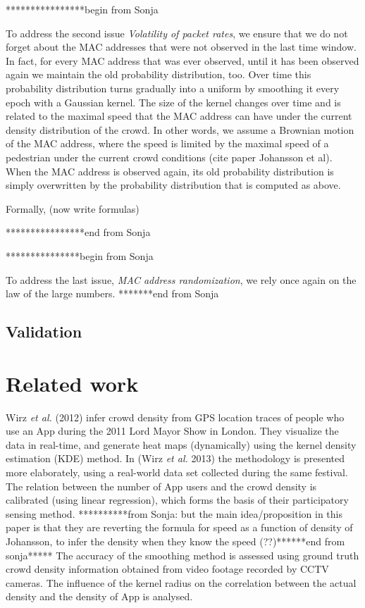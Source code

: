 \documentclass[10pt,a4paper]{article}
\begin{document}
****************begin from Sonja

To address the second issue {\it Volatility of packet rates}, we ensure that we do not forget about the MAC addresses that were not observed in the last time window. In fact, for every MAC address that was ever observed, until it has been observed again we maintain the old probability distribution, too. Over time this probability distribution turns gradually into a uniform by smoothing it every epoch with a Gaussian kernel. The size of the kernel changes over time and is related to the maximal speed that the MAC address can have under the current density distribution of the crowd. In other words, we assume a Brownian motion of the MAC address, where the speed is limited by the maximal speed of a pedestrian under the current crowd conditions (cite paper Johansson et al). When the MAC address is observed again, its old probability distribution is simply overwritten by the probability distribution that is computed as above. 

Formally,  (now write formulas) 

****************end from Sonja

***************begin from Sonja

To address the last issue, {\it MAC address randomization}, we rely once again on the law of the large numbers. 
*******end from Sonja


\subsection{Validation}



\section{Related work}

Wirz \textit{et al.} (2012) \cite{wirz:1} infer crowd density from GPS location traces of people who use an App during the 2011 Lord Mayor Show in London. They visualize the data in real-time, and generate heat maps (dynamically) using the kernel density estimation (KDE) method. In (Wirz \textit{et al.} 2013) \cite{wirz:2} the methodology is presented more elaborately, using a real-world data set collected during the same festival. The relation between the number of App users and the crowd density is calibrated (using linear regression), which forms the basis of their participatory sensing method. **********from Sonja: but the main idea/proposition in this paper is that they are reverting the formula for speed as a function of density of Johansson, to infer the density when they know the speed (??)******end from sonja*****
The accuracy of the smoothing method is assessed using ground truth crowd density information obtained from video footage recorded by CCTV cameras. 
The influence of the kernel radius on the correlation between the actual density and the density of App is analysed.
\end{document}
